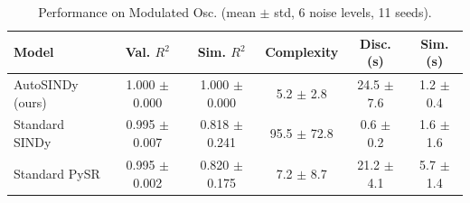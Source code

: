 \begin{table}[htbp]
\centering
\small
\renewcommand{\arraystretch}{1.2}
\caption{Performance on Modulated Osc. (mean $\pm$ std, 6 noise levels, 11 seeds).}
\label{tab:autosindy_modulated_oscillator}
\begin{tabular}{lccccc}
\toprule
Model & Val. $R^2$ & Sim. $R^2$ & Complexity & Disc. (s) & Sim. (s) \\
\midrule
AutoSINDy (ours) & 1.000 $\pm$ 0.000 & 1.000 $\pm$ 0.000 & 5.2 $\pm$ 2.8 & 24.5 $\pm$ 7.6 & 1.2 $\pm$ 0.4 \\
Standard SINDy & 0.995 $\pm$ 0.007 & 0.818 $\pm$ 0.241 & 95.5 $\pm$ 72.8 & 0.6 $\pm$ 0.2 & 1.6 $\pm$ 1.6 \\
Standard PySR & 0.995 $\pm$ 0.002 & 0.820 $\pm$ 0.175 & 7.2 $\pm$ 8.7 & 21.2 $\pm$ 4.1 & 5.7 $\pm$ 1.4 \\
\bottomrule
\end{tabular}
\end{table}